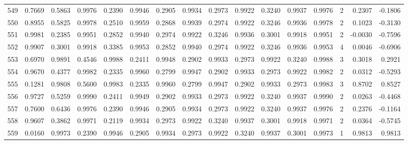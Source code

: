 \begin{tabular}{lrrrrrrrrrrrrrrr}
549 &      0.7669 &  0.5863 &  0.9976 &  0.2390 &  0.9946 &  0.2905 &  0.9934 &  0.2973 &  0.9922 &  0.3240 &   0.9937 &     0.9976 &      2 &                    0.2307 &                    -0.1806 \\
550 &      0.8955 &  0.5825 &  0.9978 &  0.2510 &  0.9959 &  0.2868 &  0.9939 &  0.2974 &  0.9922 &  0.3246 &   0.9936 &     0.9978 &      2 &                    0.1023 &                    -0.3130 \\
551 &      0.9981 &  0.2385 &  0.9951 &  0.2852 &  0.9940 &  0.2974 &  0.9922 &  0.3246 &  0.9936 &  0.3001 &   0.9918 &     0.9951 &      2 &                   -0.0030 &                    -0.7596 \\
552 &      0.9907 &  0.3001 &  0.9918 &  0.3385 &  0.9953 &  0.2852 &  0.9940 &  0.2974 &  0.9922 &  0.3246 &   0.9936 &     0.9953 &      4 &                    0.0046 &                    -0.6906 \\
553 &      0.6970 &  0.9891 &  0.4546 &  0.9988 &  0.2411 &  0.9948 &  0.2902 &  0.9933 &  0.2973 &  0.9922 &   0.3240 &     0.9988 &      3 &                    0.3018 &                     0.2921 \\
554 &      0.9670 &  0.4377 &  0.9982 &  0.2335 &  0.9960 &  0.2799 &  0.9947 &  0.2902 &  0.9933 &  0.2973 &   0.9922 &     0.9982 &      2 &                    0.0312 &                    -0.5293 \\
555 &      0.1281 &  0.9808 &  0.5600 &  0.9983 &  0.2335 &  0.9960 &  0.2799 &  0.9947 &  0.2902 &  0.9933 &   0.2973 &     0.9983 &      3 &                    0.8702 &                     0.8527 \\
556 &      0.9727 &  0.5259 &  0.9990 &  0.2411 &  0.9949 &  0.2902 &  0.9933 &  0.2973 &  0.9922 &  0.3240 &   0.9937 &     0.9990 &      2 &                    0.0263 &                    -0.4468 \\
557 &      0.7600 &  0.6436 &  0.9976 &  0.2390 &  0.9946 &  0.2905 &  0.9934 &  0.2973 &  0.9922 &  0.3240 &   0.9937 &     0.9976 &      2 &                    0.2376 &                    -0.1164 \\
558 &      0.9607 &  0.3862 &  0.9971 &  0.2119 &  0.9934 &  0.2973 &  0.9922 &  0.3240 &  0.9937 &  0.3001 &   0.9918 &     0.9971 &      2 &                    0.0364 &                    -0.5745 \\
559 &      0.0160 &  0.9973 &  0.2390 &  0.9946 &  0.2905 &  0.9934 &  0.2973 &  0.9922 &  0.3240 &  0.9937 &   0.3001 &     0.9973 &      1 &                    0.9813 &                     0.9813 \\

\end{tabular}
